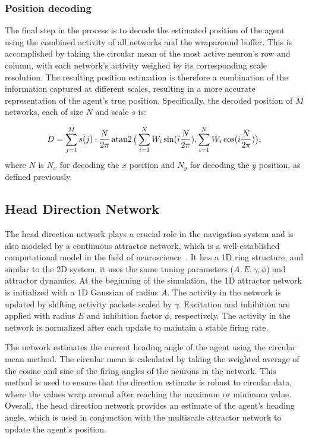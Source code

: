 %
%
%
%
%
%
%
%
%
%
%
%

\subsubsection{\textbf{Position decoding}} 
The final step in the process is to decode the estimated position of the agent using the combined activity of all networks and the wraparound buffer. This is accomplished by taking the circular mean of the most active neuron's row and column, with each network's activity weighed by its corresponding scale resolution. The resulting position estimation is therefore a combination of the information captured at different scales, resulting in a more accurate representation of the agent's true position. Specifically, the decoded position of $M$ networks, each of size $N$ and  scale $s$ is:

\begin{equation}
\small
D= \sum_{j=1}^{M} s(j)\cdot \frac{N}{2\pi} \operatorname{atan2}\big(\sum_{i=1}^{N}  W_i \sin(i \frac{N}{2\pi}),\sum_{i=1}^{N}  W_i \cos(i\frac{N}{2\pi})\big),
\end{equation}
\normalsize
where $N$ is $N_x$ for decoding the $x$ position and $ N_y$ for decoding the $y$ position, as defined previously. 


\subsection{Head Direction Network}
\label{subsec:hdnetwork}
The head direction network plays a crucial role in the navigation system and is also modeled by a continuous attractor network, which is a well-established computational model in the field of neuroscience~\cite{taube1998head,skaggs1994model}. It has a 1D ring structure, and similar to the 2D system, it uses the same tuning parameters ($A, E, \gamma, \phi$) and attractor dynamics. At the beginning of the simulation, the 1D attractor network is initialized with a 1D Gaussian of radius $A$. The activity in the network is updated by shifting activity packets scaled by $\gamma$. Excitation and inhibition are applied with radius $E$ and inhibition factor $\phi$, respectively. The activity in the network is normalized after each update to maintain a stable firing rate.

The network estimates the current heading angle of the agent using the circular mean method. The circular mean is calculated by taking the weighted average of the cosine and sine of the firing angles of the neurons in the network. This method is used to ensure that the direction estimate is robust to circular data, where the values wrap around after reaching the maximum or minimum value. Overall, the head direction network provides an estimate of the agent's heading angle, which is used in conjunction with the multiscale attractor network to update the agent's position.

